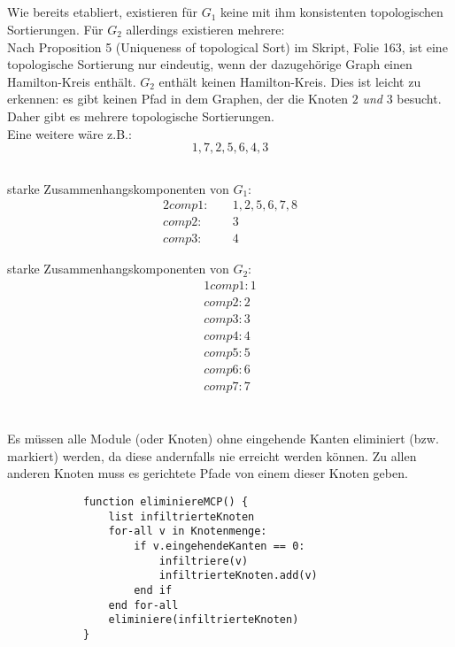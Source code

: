 \documentclass[10pt,a4paper,oneside,ngerman,numbers=noenddot]{scrartcl}
\begin{document}
        \subsection{} %
            Wie  bereits etabliert, existieren für $G_1$ keine mit ihm konsistenten topologischen Sortierungen. Für $G_2$ allerdings existieren mehrere:\\
          Nach Proposition 5 (Uniqueness of topological Sort) im Skript, Folie 163, ist eine topologische Sortierung nur eindeutig, wenn der dazugehörige Graph einen Hamilton-Kreis enthält. $G_2$ enthält keinen Hamilton-Kreis. Dies ist leicht zu erkennen: es gibt keinen Pfad in dem Graphen, der die Knoten $2$ \textit{und} $3$ besucht. Daher gibt es mehrere topologische Sortierungen.\\
          Eine weitere wäre z.B.:\\
          \[
                1, 7, 2, 5, 6, 4, 3
          \]
	\subsection{} %
		starke Zusammenhangskomponenten von $G_{1}:$
		\begin{alignat*}{2}
			comp1:&&\; 1, 2, 5, 6, 7, 8 \\
			comp2:&&\; 3 \\
			comp3:&&\; 4
		\end{alignat*}
		
		starke Zusammenhangskomponenten von $G_{2}:$
		\begin{alignat*}{1}
			comp1: 1 \\
			comp2: 2 \\
			comp3: 3 \\
			comp4: 4 \\
			comp5: 5 \\
			comp6: 6 \\
			comp7: 7
		\end{alignat*}
\section{} %
	\subsection{} %
        Es müssen alle Module (oder Knoten) ohne eingehende Kanten eliminiert (bzw. markiert) werden, da diese andernfalls nie erreicht werden können. Zu allen anderen Knoten muss es gerichtete Pfade von einem dieser Knoten geben.
        \begin{verbatim}
            function eliminiereMCP() {
                list infiltrierteKnoten
                for-all v in Knotenmenge:
                    if v.eingehendeKanten == 0:
                        infiltriere(v)
                        infiltrierteKnoten.add(v)
                    end if
                end for-all
                eliminiere(infiltrierteKnoten)
            }
                \end{verbatim}
\end{document}

